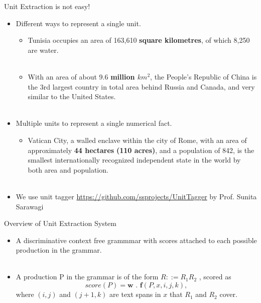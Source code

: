 \documentclass{beamer}
\begin{document}
\begin{frame}{Unit Extraction is not easy!} \pause
 
 \begin{itemize}
    \item Different ways to represent a single unit. \pause 
    \begin{itemize}
     \item Tunisia occupies an area of 163,610 \textbf{square kilometres}, of which 8,250 are water. \pause \\~\\
     \item With an area of about 9.6 \textbf{million $km^{2}$}, the People's Republic of China is the 3rd largest country in total area behind Russia and Canada, and very similar to the United States. \\~\\
    \end{itemize}
\pause
    \item Multiple units to represent a single numerical fact. \pause
    \begin{itemize}
      \item Vatican City, a walled enclave within the city of Rome, with an area of approximately \textbf{44 hectares} \textbf{(110 acres)}, and a population of 842, is the smallest internationally recognized independent state in the world by both area and population. \\~\\
    \end{itemize}
 \item We use unit tagger \url{https://github.com/ssprojects/UnitTagger} by Prof. Sunita Sarawagi
 \end{itemize}
 
\end{frame}


\begin{frame}{Overview of Unit Extraction System} \pause
 
 \begin{itemize}
  
  \item A discriminative context free grammmar with scores
attached to each possible production in the grammar. \pause \\~\\ 
  \item A production P in the grammar is of the form  $ R ::= R_{1} R_{2}$ , scored as 
\begin{equation*}
	score(P) = \textbf{w . f}(P, x, i, j, k), 
\end{equation*}
where $(i,j)$ and $(j+1,k)$ are text spans in $x$ that $R_{1}$ and $R_{2}$
cover.
 \end{itemize}
\end{frame}
\end{document}
